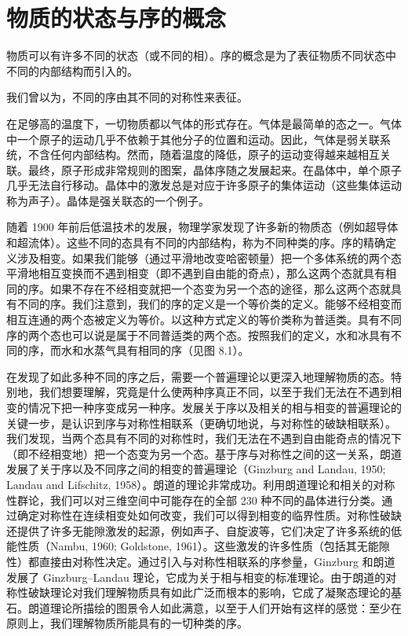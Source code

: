 \section{物质的状态与序的概念}

\begin{keypoints}
\item 物质可以有许多不同的状态（或不同的相）。序的概念是为了表征物质不同状态中不同的内部结构而引入的。
\item 我们曾以为，不同的序由其不同的对称性来表征。
\end{keypoints}

在足够高的温度下，一切物质都以气体的形式存在。气体是最简单的态之一。气体中一个原子的运动几乎不依赖于其他分子的位置和运动。因此，气体是弱关联系统，不含任何内部结构。然而，随着温度的降低，原子的运动变得越来越相互关联。最终，原子形成非常规则的图案，晶体序随之发展起来。在晶体中，单个原子几乎无法自行移动。晶体中的激发总是对应于许多原子的集体运动（这些集体运动称为声子）。晶体是强关联态的一个例子。

随着 1900 年前后低温技术的发展，物理学家发现了许多新的物质态（例如超导体和超流体）。这些不同的态具有不同的内部结构，称为不同种类的序。序的精确定义涉及相变。如果我们能够（通过平滑地改变哈密顿量）把一个多体系统的两个态平滑地相互变换而不遇到相变（即不遇到自由能的奇点），那么这两个态就具有相同的序。如果不存在不经相变就把一个态变为另一个态的途径，那么这两个态就具有不同的序。我们注意到，我们的序的定义是一个等价类的定义。能够不经相变而相互连通的两个态被定义为等价。以这种方式定义的等价类称为普适类。具有不同序的两个态也可以说是属于不同普适类的两个态。按照我们的定义，水和冰具有不同的序，而水和水蒸气具有相同的序（见图 8.1）。


在发现了如此多种不同的序之后，需要一个普遍理论以更深入地理解物质的态。特别地，我们想要理解，究竟是什么使两种序真正不同，以至于我们无法在不遇到相变的情况下把一种序变成另一种序。发展关于序以及相关的相与相变的普遍理论的关键一步，是认识到序与对称性相联系（更确切地说，与对称性的破缺相联系）。我们发现，当两个态具有不同的对称性时，我们无法在不遇到自由能奇点的情况下（即不经相变地）把一个态变为另一个态。基于序与对称性之间的这一关系，朗道发展了关于序以及不同序之间的相变的普遍理论（Ginzburg and Landau, 1950; Landau and Lifschitz, 1958）。朗道的理论非常成功。利用朗道理论和相关的对称性群论，我们可以对三维空间中可能存在的全部 230 种不同的晶体进行分类。通过确定对称性在连续相变处如何改变，我们可以得到相变的临界性质。对称性破缺还提供了许多无能隙激发的起源，例如声子、自旋波等，它们决定了许多系统的低能性质（Nambu, 1960; Goldstone, 1961）。这些激发的许多性质（包括其无能隙性）都直接由对称性决定。通过引入与对称性相联系的序参量，Ginzburg 和朗道发展了 Ginzburg--Landau 理论，它成为关于相与相变的标准理论。由于朗道的对称性破缺理论对我们理解物质具有如此广泛而根本的影响，它成了凝聚态理论的基石。朗道理论所描绘的图景令人如此满意，以至于人们开始有这样的感觉：至少在原则上，我们理解物质所能具有的一切种类的序。

